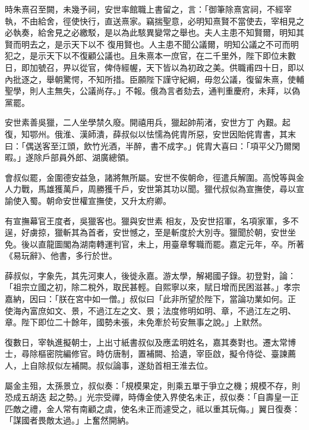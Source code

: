 \begin{pinyinscope}
 時朱熹召至闕，未幾予祠，安世率館職上書留之，言：「御筆除熹宮祠，不經宰執，不由給舍，徑使快行，直送熹家。竊揣聖意，必明知熹賢不當使去，宰相見之必執奏，給舍見之必繳駁，是以為此駭異變常之舉也。夫人主患不知賢爾，明知其賢而明去之，是示天下以不
 復用賢也。人主患不聞公議爾，明知公議之不可而明犯之，是示天下以不復顧公議也。且朱熹本一庶官，在二千里外，陛下即位未數日，即加號召，畀以從官，俾侍經幄，天下皆以為初政之美。供職甫四十日，即以內批逐之，舉朝驚愕，不知所措。臣願陛下謹守紀綱，毋忽公議，復留朱熹，使輔聖學，則人主無失，公議尚存。」不報。俄為言者劾去，通判重慶府，未拜，以偽黨罷。



 安世素善吳獵，二人坐學禁久廢。開禧用兵，獵起帥荊渚，安世方丁
 內艱。起復，知鄂州。俄淮、漢師潰，薛叔似以怯懦為侂胄所惡，安世因貽侂胄書，其末曰：「偶送客至江頭，飲竹光酒，半醉，書不成字。」侂胄大喜曰：「項平父乃爾閑暇。」遂除戶部員外郎、湖廣總領。



 會叔似罷，金圍德安益急，諸將無所屬。安世不俟朝命，徑遣兵解圍。高悅等與金人力戰，馬雄獲萬戶，周勝獲千戶，安世第其功以聞。獵代叔似為宣撫使，尋以宣諭使入蜀。朝命安世權宣撫使，又升太府卿。



 有宣撫幕官王度者，吳獵客也。獵與安世素
 相友，及安世招軍，名項家軍，多不逞，好虜掠，獵斬其為首者，安世憾之，至是斬度於大別寺。獵聞於朝，安世坐免。後以直龍圖閣為湖南轉運判官，未上，用臺章奪職而罷。嘉定元年，卒。所著《易玩辭》、他書，多行於世。



 薛叔似，字象先，其先河東人，後徙永嘉。游太學，解褐國子錄。初登對，論：「祖宗立國之初，除二稅外，取民甚輕。自熙寧以來，賦日增而民困滋甚。」孝宗嘉納，因曰：「朕在宮中如一僧。」叔似曰「此非所望於陛下，當論功業如何。正
 使海內富庶如文、景，不過江左之文、景；法度修明如明、章，不過江左之明、章。陛下即位二十餘年，國勢未張，未免牽於茍安無事之說。」上默然。



 復數日，宰執進擬朝士，上出寸紙書叔似及應孟明姓名，嘉其奏對也。遷太常博士，尋除樞密院編修官。時仿唐制，置補闕、拾遺，宰臣啟，擬令侍從、臺諫薦人，上自除叔似左補闕。叔似論事，遂劾首相王淮去位。



 屬金主殂，太孫景立，叔似奏：「規模果定，則乘五單于爭立之機；規模不存，則恐成五胡迭
 起之勢。」光宗受禪，時傳金使入界使名未正，叔似奏：「自壽皇一正匹敵之禮，金人常有南顧之虞，使名未正而遽受之，祗以重其玩侮。」翼日復奏：「謀國者畏敵太過。」上奮然開納。




\end{pinyinscope}
